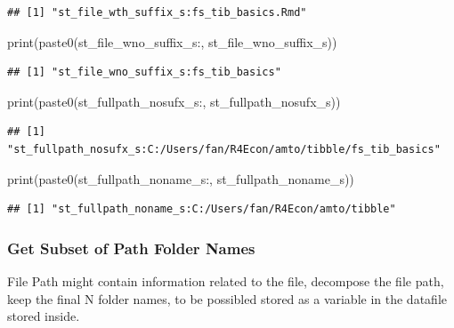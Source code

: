 \documentclass[
]{book}
\newenvironment{Shaded}{\begin{snugshade}}{\end{snugshade}}
\newcommand{\FunctionTok}[1]{\textcolor[rgb]{0.00,0.00,0.00}{#1}}
\newcommand{\NormalTok}[1]{#1}
\newcommand{\StringTok}[1]{\textcolor[rgb]{0.31,0.60,0.02}{#1}}
\begin{document}
\begin{verbatim}
## [1] "st_file_wth_suffix_s:fs_tib_basics.Rmd"
\end{verbatim}

\begin{Shaded}
\begin{Highlighting}[]
\FunctionTok{print}\NormalTok{(}\FunctionTok{paste0}\NormalTok{(}\StringTok{\textquotesingle{}st\_file\_wno\_suffix\_s:\textquotesingle{}}\NormalTok{, st\_file\_wno\_suffix\_s))}
\end{Highlighting}
\end{Shaded}

\begin{verbatim}
## [1] "st_file_wno_suffix_s:fs_tib_basics"
\end{verbatim}

\begin{Shaded}
\begin{Highlighting}[]
\FunctionTok{print}\NormalTok{(}\FunctionTok{paste0}\NormalTok{(}\StringTok{\textquotesingle{}st\_fullpath\_nosufx\_s:\textquotesingle{}}\NormalTok{, st\_fullpath\_nosufx\_s))}
\end{Highlighting}
\end{Shaded}

\begin{verbatim}
## [1] "st_fullpath_nosufx_s:C:/Users/fan/R4Econ/amto/tibble/fs_tib_basics"
\end{verbatim}

\begin{Shaded}
\begin{Highlighting}[]
\FunctionTok{print}\NormalTok{(}\FunctionTok{paste0}\NormalTok{(}\StringTok{\textquotesingle{}st\_fullpath\_noname\_s:\textquotesingle{}}\NormalTok{, st\_fullpath\_noname\_s))}
\end{Highlighting}
\end{Shaded}

\begin{verbatim}
## [1] "st_fullpath_noname_s:C:/Users/fan/R4Econ/amto/tibble"
\end{verbatim}

\hypertarget{get-subset-of-path-folder-names}{%
\subsubsection{Get Subset of Path Folder Names}\label{get-subset-of-path-folder-names}}

File Path might contain information related to the file, decompose the file path, keep the final N folder names, to be possibled stored as a variable in the datafile stored inside.
\end{document}
